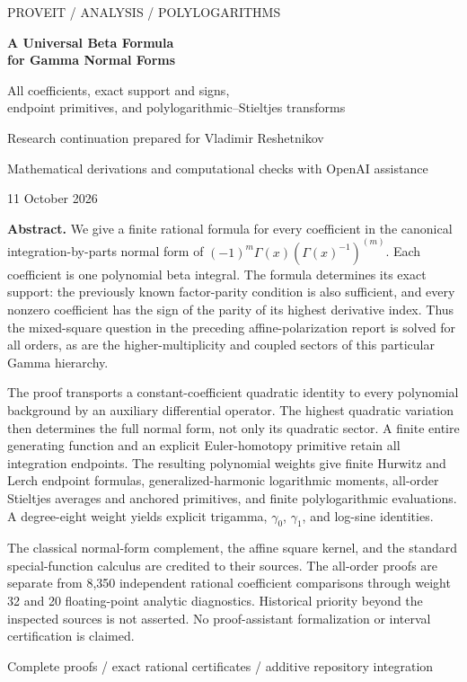 \documentclass[11pt,letterpaper]{article}
\numberwithin{equation}{section}
\theoremstyle{definition}\newtheorem{definition}[theorem]{Definition}
\theoremstyle{remark}\newtheorem{remark}[theorem]{Remark}
\begin{document}
\hypersetup{pageanchor=false}
\begin{titlepage}
\centering
\vspace*{0.7cm}
{\large\sffamily PROVEIT / ANALYSIS / POLYLOGARITHMS\par}
\vspace{1.0cm}
{\Huge\bfseries A Universal Beta Formula\\[0.15em] for Gamma Normal Forms\par}
\vspace{0.7cm}
{\Large All coefficients, exact support and signs,\\[0.2em]
endpoint primitives, and polylogarithmic--Stieltjes transforms\par}
\vspace{0.75cm}
{\large Research continuation prepared for Vladimir Reshetnikov\par}
\vspace{0.2cm}
{Mathematical derivations and computational checks with OpenAI assistance\par}
\vspace{0.2cm}
{11 October 2026\par}
\vspace{0.75cm}
\begin{minipage}{0.94\textwidth}
\small
\textbf{Abstract.}
We give a finite rational formula for every coefficient in the canonical
integration-by-parts normal form of
$(-1)^m\Gamma(x)(\Gamma(x)^{-1})^{(m)}$.
Each coefficient is one polynomial beta integral. The formula determines
its exact support: the previously known factor-parity condition is also
sufficient, and every nonzero coefficient has the sign of the parity of
its highest derivative index. Thus the mixed-square question in the
preceding affine-polarization report is solved for all orders, as are the
higher-multiplicity and coupled sectors of this particular Gamma hierarchy.

The proof transports a constant-coefficient quadratic identity to every
polynomial background by an auxiliary differential operator. The highest
quadratic variation then determines the full normal form, not only its
quadratic sector. A finite entire generating function and an explicit
Euler-homotopy primitive retain all integration endpoints.
The resulting polynomial weights give finite Hurwitz and Lerch endpoint
formulas, generalized-harmonic logarithmic moments, all-order Stieltjes
averages and anchored primitives, and finite polylogarithmic evaluations.
A degree-eight weight yields explicit trigamma, $\gamma_0$, $\gamma_1$,
and log-sine identities.

The classical normal-form complement, the affine square kernel, and the
standard special-function calculus are credited to their sources.
The all-order proofs are separate from 8,350 independent rational
coefficient comparisons through weight 32 and 20 floating-point analytic
diagnostics. Historical priority beyond the inspected sources is not
asserted. No proof-assistant formalization or interval certification is
claimed.
\end{minipage}
\vfill
{\small\sffamily Complete proofs \enspace / \enspace exact rational certificates
\enspace / \enspace additive repository integration\par}
\end{titlepage}
\end{document}
